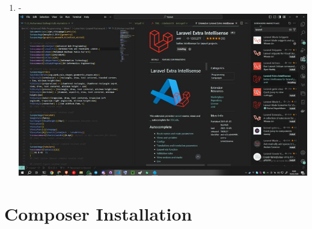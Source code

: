 \documentclass[12pt,titlepage]{article}
\begin{document}
\begin{enumerate}[label= \alph*.]
    \item - \\ \includegraphics[width=.9\textwidth]{images/figures/VSCode 4.jpg}
\end{enumerate}

\newpage

\section{Composer Installation}
\end{document}

